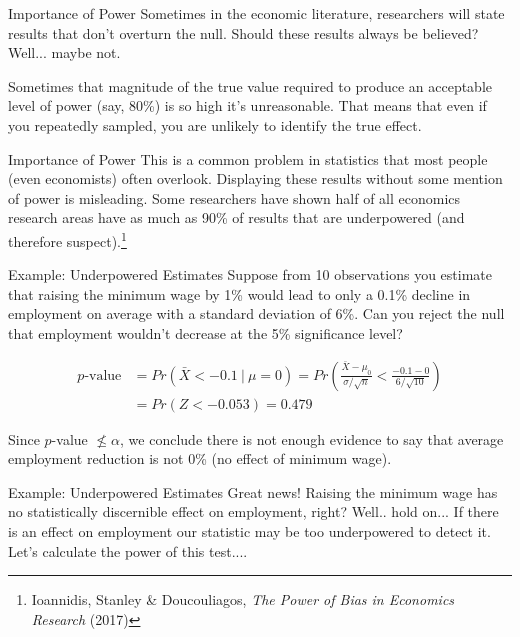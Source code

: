 \documentclass{beamer}
\begin{document}
	
\begin{frame}{Importance of Power}
	Sometimes in the economic literature, researchers will state results that don't overturn the null.  Should these results always be believed? Well... maybe not.
	
	\vspace{10mm}

	Sometimes that magnitude of the true value required to produce an acceptable level of power (say, 80\%) is so high it's unreasonable.   That means that even if you repeatedly sampled, you are unlikely to identify the true effect.
\end{frame}
		 

\begin{frame}{Importance of Power}
	This is a common problem in statistics that most people (even economists) often overlook.   Displaying these results without some mention of power is misleading. Some researchers have shown half of all economics research areas have as much as 90\% of results that are underpowered (and therefore suspect).\footnote{\tiny Ioannidis, Stanley \& Doucouliagos, \textit{The Power of Bias in Economics Research} (2017)}
\end{frame}


\begin{frame}{Example: Underpowered Estimates}
	Suppose from 10 observations you estimate that raising the minimum wage by 1\% would lead to only a 0.1\% decline in employment on average with a standard deviation of 6\%.   Can you reject the null that employment wouldn't decrease at the 5\% significance level?
			 
	\begin{align*} 
		p\text{-value} & = Pr(\bar{X} < -0.1 \ \vert \ \mu=0) = Pr\left(\frac{\bar{X} - \mu_0}{\sigma / \sqrt{n}} < \frac{-0.1 - 0}{6/\sqrt{10}}\right) \\
		& = Pr(Z < -0.053) = 0.479      
	\end{align*}
			 
	Since $p$-value $\nleqslant \alpha$, we conclude there is not enough evidence to say that average employment reduction is not 0\% (no effect of minimum wage).
\end{frame}

\begin{frame}{Example: Underpowered Estimates}
	Great news! Raising the minimum wage has no statistically discernible effect on employment, right?   Well.. hold on... If there is an effect on employment our statistic may be too underpowered to detect it.  		 
	Let's calculate the power of this test....
\end{frame}
\end{document}
